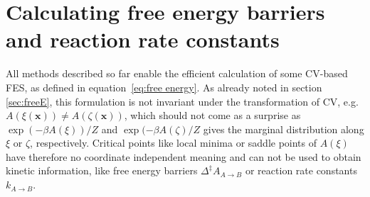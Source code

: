 \section{Calculating free energy barriers and reaction rate constants}
\label{sec:A_geom}
All methods described so far enable the efficient calculation of some CV-based FES, as defined in equation~\ref{eq:free energy}.
As already noted in section \ref{sec:freeE}, this formulation is not invariant under the transformation of CV, e.g. $A(\xi(\textbf{x}))\neq A(\zeta(\textbf{x}))$, which should not come as a surprise as $\exp(-\beta A(\xi))/Z$ and $\exp(-\beta A({\zeta})/Z$ gives the marginal distribution along $\xi$ or $\zeta$, respectively.
Critical points like local minima or saddle points of $A(\xi)$ have therefore no coordinate independent meaning and can not be used to obtain kinetic information, like free energy barriers $\Delta^\ddagger A_{A\rightarrow B}$ or reaction rate constants $k_{A\rightarrow B}$.\autocite{bal2020free}

